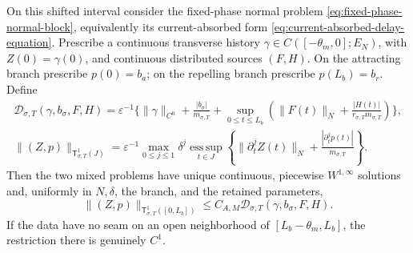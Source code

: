\begin{proposition}
On this shifted interval consider the fixed-phase normal problem
\cref{eq:fixed-phase-normal-block}, equivalently its current-absorbed form
\cref{eq:current-absorbed-delay-equation}.  Prescribe a continuous
transverse history
\(\gamma\in C([-\theta_m,0];E_N)\), with
\(Z(0)=\gamma(0)\), and continuous distributed sources \((F,H)\).
On the attracting branch prescribe \(p(0)=b_a\); on the repelling branch
prescribe \(p(L_b)=b_r\).  Define
\begin{align}
 \mathcal D_{\sigma,T}(\gamma,b_\sigma,F,H)
 =\varepsilon^{-1}\biggl\{
   \|\gamma\|_{C^0}
   +\frac{|b_\sigma|}{m_{\sigma,T}}
   +\sup_{0\le t\le L_b}
       \left(\|F(t)\|_N
             +\frac{|H(t)|}
                    {r_{\sigma,T}m_{\sigma,T}}\right)
                         \biggr\},               \label{eq:terminal-component-data-norm}\\
 \|(Z,p)\|_{\mathsf T_{\sigma,T}^1(J)}
 =\varepsilon^{-1}\max_{0\le j\le1}\delta^j
   \operatorname*{ess\,sup}_{t\in J}
       \left\{\|\partial_t^jZ(t)\|_N
              +\frac{|\partial_t^jp(t)|}{m_{\sigma,T}}\right\}.
                                                        \label{eq:terminal-component-trace-norm}
\end{align}
Then the two mixed problems have unique continuous, piecewise
\(W^{1,\infty}\) solutions and, uniformly in \(N,\delta\), the branch,
and the retained parameters,
\begin{equation}
 \|(Z,p)\|_{\mathsf T_{\sigma,T}^1([0,L_b])}
 \le C_{A,M}\mathcal D_{\sigma,T}(\gamma,b_\sigma,F,H).
                                                        \label{eq:terminal-component-source-bound}
\end{equation}
If the data have no seam on an open neighborhood of
\([L_b-\theta_m,L_b]\), the restriction there is genuinely \(C^1\).


\end{proposition}

